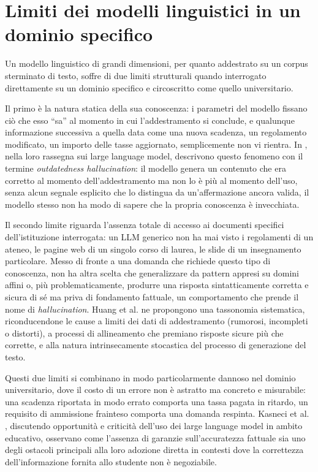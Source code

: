 \section{Limiti dei modelli linguistici in un dominio specifico}
\label{sec:problema}

Un modello linguistico di grandi dimensioni, per quanto addestrato su un corpus sterminato di testo, soffre di due limiti strutturali quando interrogato direttamente su un dominio specifico e circoscritto come quello universitario.

Il primo è la natura statica della sua conoscenza: i parametri del modello fissano ciò che esso ``sa'' al momento in cui l'addestramento si conclude, e qualunque informazione successiva a quella data come una nuova scadenza, un regolamento modificato, un importo delle tasse aggiornato, semplicemente non vi rientra. 
In \cite{zhao2023survey}, nella loro rassegna sui large language model, descrivono questo fenomeno con il termine \emph{outdatedness hallucination}: il modello genera un contenuto che era corretto al momento dell'addestramento ma non lo è più al momento dell'uso, senza alcun segnale esplicito che lo distingua da un'affermazione ancora valida, il modello stesso non ha modo di sapere che la propria conoscenza è invecchiata.

Il secondo limite riguarda l'assenza totale di accesso ai documenti specifici dell'istituzione interrogata: un LLM generico non ha mai visto i regolamenti di un ateneo, le pagine web di un singolo corso di laurea, le slide di un insegnamento particolare. Messo di fronte a una domanda che richiede questo tipo di conoscenza, non ha altra scelta che generalizzare da pattern appresi su domini affini o, più problematicamente, produrre una risposta sintatticamente corretta e sicura di sé ma priva di fondamento fattuale, un comportamento che prende il nome di \emph{hallucination}. Huang et al. \cite{huang2023survey} ne propongono una tassonomia sistematica, riconducendone le cause a limiti dei dati di addestramento (rumorosi, incompleti o distorti), a processi di allineamento che premiano risposte sicure più che corrette, e alla natura intrinsecamente stocastica del processo di
generazione del testo.

Questi due limiti si combinano in modo particolarmente dannoso nel dominio universitario, dove il costo di un errore non è astratto ma concreto e misurabile: una scadenza riportata in modo errato comporta una tassa pagata in ritardo, un requisito di ammissione frainteso comporta una domanda respinta. Kasneci et al. \cite{kasneci2023chatgpt}, discutendo opportunità e criticità dell'uso dei large language model in ambito educativo, osservano come l'assenza di garanzie sull'accuratezza fattuale sia uno degli ostacoli principali alla loro adozione diretta in contesti dove la correttezza dell'informazione fornita allo studente non è negoziabile.

